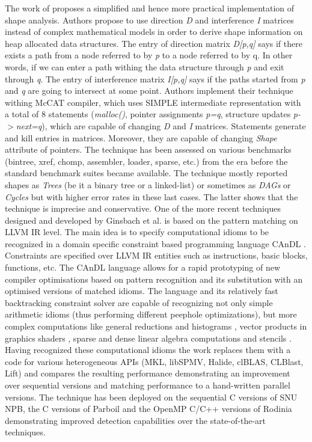 \quad The work of \cite{Ghiya:1996:TDC:237721.237724} proposes a simplified and hence more practical implementation of shape analysis. Authors propose to use direction \textit{D} and interference \textit{I} matrices instead of complex mathematical models in order to derive shape information on heap allocated data structures. The entry of direction matrix \textit{D[p,q]} says if there exists a path from a node referred to by \textit{p} to a node referred to by q. In other words, if we can enter a path withing the data structure through \textit{p} and exit through \textit{q}. The entry of interference matrix \textit{I[p,q]} says if the paths started from \textit{p} and \textit{q} are going to intersect at some point. Authors implement their technique withing McCAT compiler, which uses SIMPLE intermediate representation with a total of 8 statements (\textit{malloc()}, pointer assignments \textit{p=q}, structure updates \textit{p-$>$next=q}), which are capable of changing \textit{D} and \textit{I} matrices. Statements generate and kill entries in matrices. Moreover, they are capable of changing \textit{Shape} attribute of pointers. The technique has been assessed on various benchmarks (bintree, xref, chomp, assembler, loader, sparse, etc.) from the era before the standard benchmark suites became available. The technique mostly reported shapes as \textit{Trees} (be it a binary tree or a linked-list) or sometimes as \textit{DAGs} or \textit{Cycles} but with higher error rates in these last cases. The latter shows that the technique is imprecise and conservative.\newline\null
\quad One of the more recent techniques designed and developed by Ginsbach et al. is based on the pattern matching on LLVM IR level. The main idea is to specify computational idioms to be recognized in a domain specific constraint based programming language CAnDL \cite{Ginsbach:2018:CDS:3178372.3179515}. Constraints are specified over LLVM IR entities such as instructions, basic blocks, functions, etc. The CAnDL language allows for a rapid prototyping of new compiler optimisations based on pattern recognition and its substitution with an optimised versions of matched idioms. The language and its relatively fast backtracking constraint solver are capable of recognizing not only simple arithmetic idioms (thus performing different peephole optimizations), but more complex computations like general reductions and histograms \cite{Ginsbach:2017:DEG:3049832.3049862}, vector products in graphics shaders \cite{Ginsbach:2018:AML:3296957.3173182}, sparse and dense linear algebra computations and stencils \cite{Ginsbach:2018:AML:3296957.3173182}. Having recognized these computational idioms the work \cite{Ginsbach:2018:AML:3296957.3173182} replaces them with a code for various heterogeneous APIs (MKL, libSPMV, Halide, clBLAS, CLBlast, Lift) and compares the resulting performance demonstrating an improvement over sequential versions and matching performance to a hand-written parallel versions. The technique has been deployed on the sequential C versions of SNU NPB, the C versions of Parboil and the OpenMP C/C++ versions of Rodinia demonstrating improved detection capabilities over the state-of-the-art techniques.\newline\null
